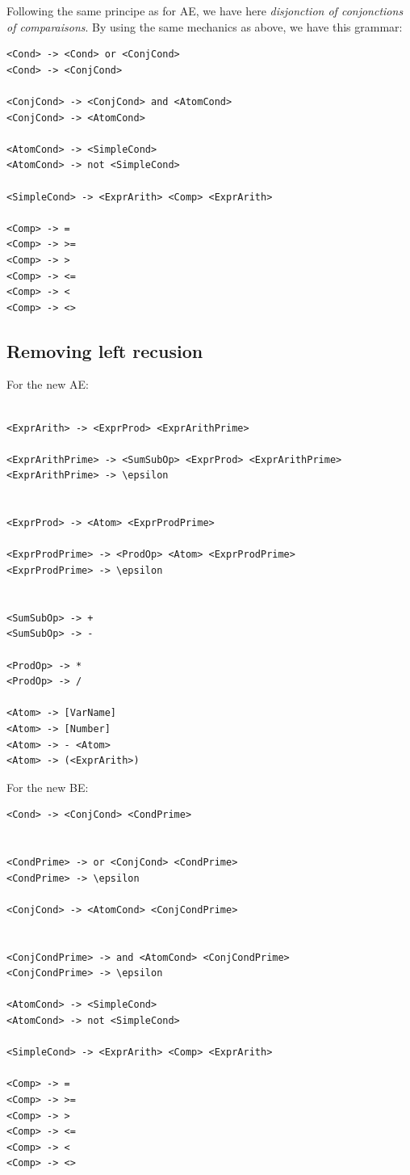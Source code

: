 \documentclass[letterpaper]{article}
\begin{document}
Following the same principe as for AE, we have here
\textit{disjonction of conjonctions of comparaisons}. By using the same
mechanics as above, we have this grammar:


\begin{lstlisting}
<Cond> -> <Cond> or <ConjCond>
<Cond> -> <ConjCond>

<ConjCond> -> <ConjCond> and <AtomCond>
<ConjCond> -> <AtomCond>

<AtomCond> -> <SimpleCond>
<AtomCond> -> not <SimpleCond>

<SimpleCond> -> <ExprArith> <Comp> <ExprArith>

<Comp> -> =
<Comp> -> >=
<Comp> -> >
<Comp> -> <=
<Comp> -> <
<Comp> -> <>

\end{lstlisting}

\subsection{Removing left recusion}

For the new AE:

\begin{lstlisting}

<ExprArith> -> <ExprProd> <ExprArithPrime>

<ExprArithPrime> -> <SumSubOp> <ExprProd> <ExprArithPrime>
<ExprArithPrime> -> \epsilon


<ExprProd> -> <Atom> <ExprProdPrime>

<ExprProdPrime> -> <ProdOp> <Atom> <ExprProdPrime>
<ExprProdPrime> -> \epsilon


<SumSubOp> -> +
<SumSubOp> -> -

<ProdOp> -> *
<ProdOp> -> /

<Atom> -> [VarName]
<Atom> -> [Number]
<Atom> -> - <Atom>
<Atom> -> (<ExprArith>)

\end{lstlisting}


For the new BE:

\begin{lstlisting}
<Cond> -> <ConjCond> <CondPrime>


<CondPrime> -> or <ConjCond> <CondPrime>
<CondPrime> -> \epsilon

<ConjCond> -> <AtomCond> <ConjCondPrime>


<ConjCondPrime> -> and <AtomCond> <ConjCondPrime>
<ConjCondPrime> -> \epsilon

<AtomCond> -> <SimpleCond>
<AtomCond> -> not <SimpleCond>

<SimpleCond> -> <ExprArith> <Comp> <ExprArith>

<Comp> -> =
<Comp> -> >=
<Comp> -> >
<Comp> -> <=
<Comp> -> <
<Comp> -> <>

\end{lstlisting}
\end{document}
